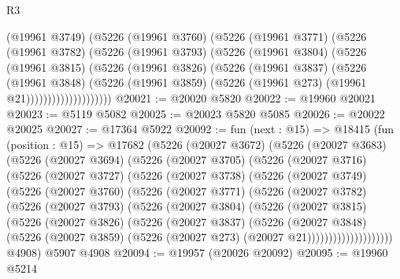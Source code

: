 \begin{lexlean}{R3}
\begin{coremodule}
                    (@19961 @3749)
                    (@5226
                      (@19961 @3760)
                      (@5226
                        (@19961 @3771)
                        (@5226
                          (@19961 @3782)
                          (@5226
                            (@19961 @3793)
                            (@5226
                              (@19961 @3804)
                              (@5226
                                (@19961 @3815)
                                (@5226
                                  (@19961 @3826)
                                  (@5226
                                    (@19961 @3837)
                                    (@5226
                                      (@19961 @3848)
                                      (@5226
                                        (@19961 @3859)
                                        (@5226 (@19961 @273) (@19961 @21))))))))))))))))))))
@20021 := @20020 @5820
@20022 := @19960 @20021
@20023 := @5119 @5082
@20025 := @20023 @5820 @5085
@20026 := @20022 @20025
@20027 := @17364 @5922
@20092 := fun (next : @15) =>
  @18415
    (fun (position : @15) =>
    @17682
      (@5226
        (@20027 @3672)
        (@5226
          (@20027 @3683)
          (@5226
            (@20027 @3694)
            (@5226
              (@20027 @3705)
              (@5226
                (@20027 @3716)
                (@5226
                  (@20027 @3727)
                  (@5226
                    (@20027 @3738)
                    (@5226
                      (@20027 @3749)
                      (@5226
                        (@20027 @3760)
                        (@5226
                          (@20027 @3771)
                          (@5226
                            (@20027 @3782)
                            (@5226
                              (@20027 @3793)
                              (@5226
                                (@20027 @3804)
                                (@5226
                                  (@20027 @3815)
                                  (@5226
                                    (@20027 @3826)
                                    (@5226
                                      (@20027 @3837)
                                      (@5226
                                        (@20027 @3848)
                                        (@5226
                                          (@20027 @3859)
                                          (@5226 (@20027 @273) (@20027 @21))))))))))))))))))))
      @4908)
    @5907
    @4908
@20094 := @19957 (@20026 @20092)
@20095 := @19960 @5214

\end{coremodule}
\end{lexlean}
